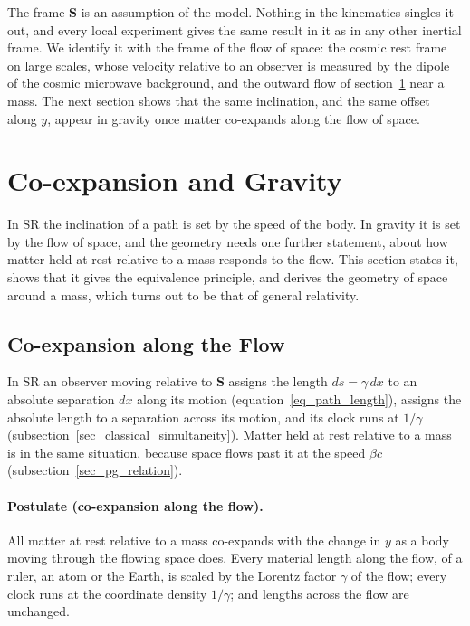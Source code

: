 \documentclass{iopjournal}
\begin{document}
The frame $\mathbf{S}$ is an assumption of the model. Nothing in the kinematics singles it out, and every local experiment gives the same result in it as in any other inertial frame. We identify it with the frame of the flow of space: the cosmic rest frame on large scales, whose velocity relative to an observer is measured by the dipole of the cosmic microwave background, and the outward flow of section~\ref{sec_gravity} near a mass. The next section shows that the same inclination, and the same offset along $y$, appear in gravity once matter co-expands along the flow of space.

\section{Co-expansion and Gravity}\label{sec_gravity}

In SR the inclination of a path is set by the speed of the body. In gravity it is set by the flow of space, and the geometry needs one further statement, about how matter held at rest relative to a mass responds to the flow. This section states it, shows that it gives the equivalence principle, and derives the geometry of space around a mass, which turns out to be that of general relativity.

\subsection{Co-expansion along the Flow}\label{sec_coexp_postulate}

In SR an observer moving relative to $\mathbf{S}$ assigns the length $ds=\gamma\,dx$ to an absolute separation $dx$ along its motion (equation~\eqref{eq_path_length}), assigns the absolute length to a separation across its motion, and its clock runs at $1/\gamma$ (subsection~\ref{sec_classical_simultaneity}). Matter held at rest relative to a mass is in the same situation, because space flows past it at the speed $\beta c$ (subsection~\ref{sec_pg_relation}).

\paragraph{Postulate (co-expansion along the flow).} All matter at rest relative to a mass co-expands with the change in $y$ as a body moving through the flowing space does. Every material length along the flow, of a ruler, an atom or the Earth, is scaled by the Lorentz factor $\gamma$ of the flow; every clock runs at the coordinate density $1/\gamma$; and lengths across the flow are unchanged.
\end{document}
